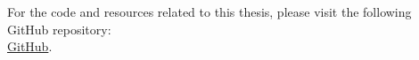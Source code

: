 \noindent
For the code and resources related to this thesis, please visit the following GitHub repository:\\
\href{https://github.com/Harithelamin/MOEA}{GitHub}.